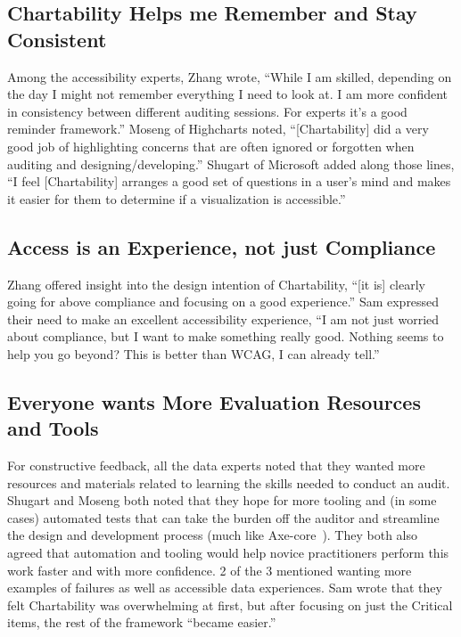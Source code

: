 \documentclass{egpubl}
\begin{document}
\subsection{Chartability Helps me Remember and Stay Consistent}
Among the accessibility experts, Zhang wrote, ``While I am skilled, depending on the day I might not remember everything I need to look at. I am more confident in consistency between different auditing sessions. For experts it’s a good reminder framework.'' Moseng of Highcharts noted, ``[Chartability] did a very good job of highlighting concerns that are often ignored or forgotten when auditing and designing/developing.'' Shugart of Microsoft added along those lines, ``I feel [Chartability] arranges a good set of questions in a user’s mind and makes it easier for them to determine if a visualization is accessible.''

\subsection{Access is an Experience, not just Compliance}
Zhang offered insight into the design intention of Chartability, ``[it is] clearly going for above compliance and focusing on a good experience.'' Sam expressed their need to make an excellent accessibility experience, ``I am not just worried about compliance, but I want to make something really good. Nothing seems to help you go beyond? This is better than WCAG, I can already tell.''

\subsection{Everyone wants More Evaluation Resources and Tools}
For constructive feedback, all the data experts noted that they wanted more resources and materials related to learning the skills needed to conduct an audit. Shugart and Moseng both noted that they hope for more tooling and (in some cases) automated tests that can take the burden off the auditor and streamline the design and development process (much like Axe-core~\cite{noauthor_axe-core_2021}). They both also agreed that automation and tooling would help novice practitioners perform this work faster and with more confidence. 2 of the 3 mentioned wanting more examples of failures as well as accessible data experiences. Sam wrote that they felt Chartability was overwhelming at first, but after focusing on just the Critical items, the rest of the framework ``became easier.''
\end{document}
